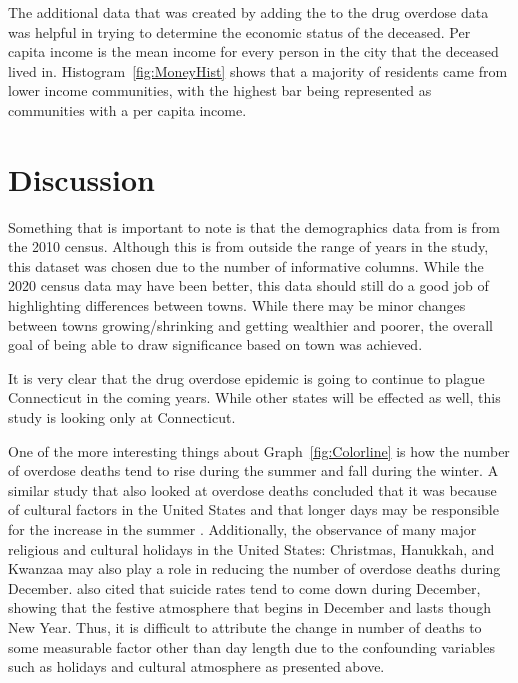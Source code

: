 \documentclass[12pt, letterpaper, titlepage]{article}
\begin{document}
The additional data that was created by adding the \citet{wikiwand_2023} to the drug overdose data was helpful in trying to determine the economic status of the deceased.  Per capita income is the mean income for every person in the city that the deceased lived in.  Histogram~\ref{fig:MoneyHist} shows that a majority of residents came from lower income communities, with the highest bar being represented as communities with a per capita income.  

\section{Discussion}\label{sec:Discussion}
Something that is important to note is that the demographics data from \citet{wikiwand_2023} is from the 2010 census.  Although this is from outside the range of years in the study, this dataset was chosen due to the number of informative columns.  While the 2020 census data may have been better, this data should still do a good job of highlighting differences between towns.  While there may be minor changes between towns growing/shrinking and getting wealthier and poorer, the overall goal of being able to draw significance based on town was achieved.

It is very clear that the drug overdose epidemic is going to continue to plague Connecticut in the coming years.  While other states will be effected as well, this study is looking only at Connecticut.

One of the more interesting things about Graph~\ref{fig:Colorline} is how the number of overdose deaths tend to rise during the summer and fall during the winter.  A similar study that also looked at overdose deaths concluded that it was because of cultural factors in the United States and that longer days may be responsible for the increase in the summer \citep{han2022intentional}.  Additionally, the observance of many major religious and cultural holidays in the United States: Christmas, Hanukkah, and Kwanzaa may also play a role in reducing the number of overdose deaths during December.  \citet*{han2022intentional} also cited that suicide rates tend to come down during December, showing that the festive atmosphere that begins in December and lasts though New Year.  Thus, it is difficult to attribute the change in number of deaths to some measurable factor other than day length due to the confounding variables such as holidays and cultural atmosphere as presented above.
\end{document}
